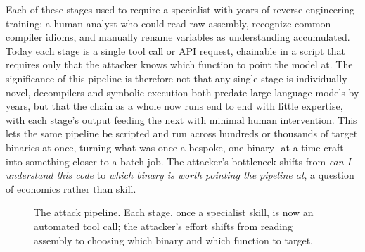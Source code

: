 \documentclass[conference]{IEEEtran}
\begin{document}
Each of these stages used to require a specialist with years of reverse-engineering
training: a human analyst who could read raw assembly, recognize common compiler
idioms, and manually rename variables as understanding accumulated. Today each
stage is a single tool call or API request, chainable in a script that requires
only that the attacker knows which function to point the model at. The
significance of this pipeline is therefore not that any single stage is
individually novel, decompilers and symbolic execution both predate large language
models by years, but that the chain as a whole now runs end to end with little
expertise, with each stage's output feeding the next with minimal human
intervention. This lets the same pipeline be scripted and run across hundreds or
thousands of target binaries at once, turning what was once a bespoke, one-binary-
at-a-time craft into something closer to a batch job. The attacker's bottleneck
shifts from \emph{can I understand this code} to \emph{which binary is worth
pointing the pipeline at}, a question of economics rather than skill.

\begin{figure}[t]
\centering
{}
\caption{The attack pipeline. Each stage, once a specialist skill, is now an
automated tool call; the attacker's effort shifts from reading assembly to
choosing which binary and which function to target.}
\label{fig:pipeline}
\end{figure}
\end{document}
